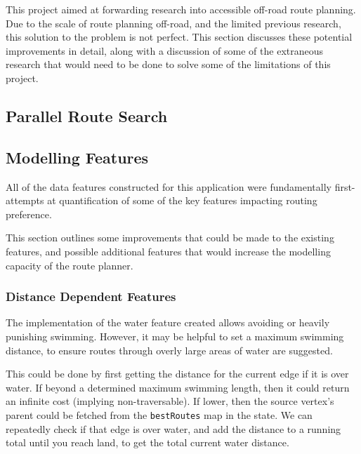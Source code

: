 \documentclass[12pt]{article}
\begin{document}
This project aimed at forwarding research into accessible off-road route planning. Due to the scale of route planning off-road, and the limited previous research, this solution to the problem is not perfect. This section discusses these potential improvements in detail, along with a discussion of some of the extraneous research that would need to be done to solve some of the limitations of this project.

\subsection{Parallel Route Search}


\subsection{Modelling Features}

All of the data features constructed for this application were fundamentally first-attempts at quantification of some of the key features impacting routing preference.

This section outlines some improvements that could be made to the existing features, and possible additional features that would increase the modelling capacity of the route planner.

\subsubsection{Distance Dependent Features}

The implementation of the water feature created allows avoiding or heavily punishing swimming. However, it may be helpful to set a maximum swimming distance, to ensure routes through overly large areas of water are suggested.

This could be done by first getting the distance for the current edge if it is over water. If beyond a determined maximum swimming length, then it could return an infinite cost (implying non-traversable). If lower, then the source vertex's parent could be fetched from the \texttt{bestRoutes} map in the state. We can repeatedly check if that edge is over water, and add the distance to a running total until you reach land, to get the total current water distance.
\end{document}
